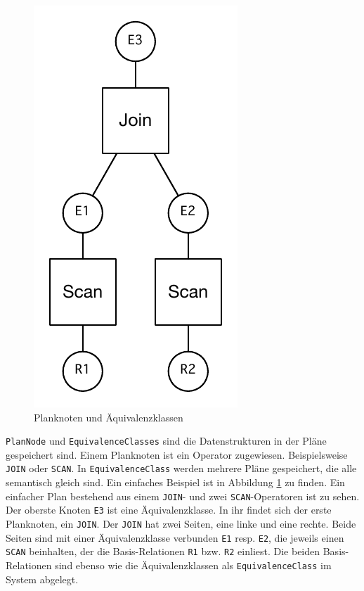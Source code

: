 \begin{figure}[ht]
  \centering
  \includegraphics[scale=0.75]{04_Implementierung/00_media/JoinScan.pdf}
  \caption{Planknoten und Äquivalenzklassen}
  \label{PlanAequi}
\end{figure}

\texttt{Plan\-Node} und \texttt{Equi\-valence\-Classes} sind die Datenstrukturen in der Pläne gespeichert sind. Einem Planknoten ist ein Operator zugewiesen. Beispielsweise \texttt{JOIN} oder \texttt{SCAN}. In \texttt{Equi\-valence\-Class} werden mehrere Pläne gespeichert, die alle semantisch gleich sind. Ein einfaches Beispiel ist in Abbildung \ref{PlanAequi} zu finden. Ein einfacher Plan bestehend aus einem \texttt{JOIN}- und zwei \texttt{SCAN}-Operatoren ist zu sehen. Der oberste Knoten \texttt{E3} ist eine Äquivalenzklasse. In ihr findet sich der erste Planknoten, ein \texttt{JOIN}. Der \texttt{JOIN} hat zwei Seiten, eine linke und eine rechte. Beide Seiten sind mit einer Äquivalenzklasse verbunden \texttt{E1} resp. \texttt{E2}, die jeweils einen \texttt{SCAN} beinhalten, der die Basis-Relationen \texttt{R1} bzw. \texttt{R2} einliest. Die beiden Basis-Relationen sind ebenso wie die Äquivalenzklassen als \texttt{Equi\-valence\-Class} im System abgelegt.




